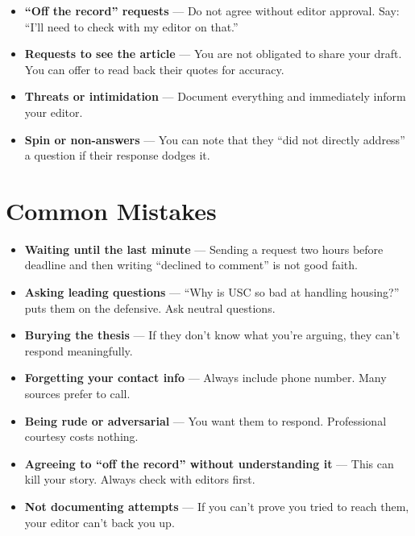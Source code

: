 \documentclass[12pt]{article}
\newcommand{\key}[1]{\textbf{#1}}
\begin{document}
\begin{exampleblock}
\begin{itemize}
  \item \key{``Off the record'' requests} --- Do not agree without editor approval. Say: ``I'll need to check with my editor on that.''
  \item \key{Requests to see the article} --- You are not obligated to share your draft. You can offer to read back their quotes for accuracy.
  \item \key{Threats or intimidation} --- Document everything and immediately inform your editor.
  \item \key{Spin or non-answers} --- You can note that they ``did not directly address'' a question if their response dodges it.
\end{itemize}
\end{exampleblock}

\section{Common Mistakes}

\begin{badbox}
\begin{itemize}
  \item \key{Waiting until the last minute} --- Sending a request two hours before deadline and then writing ``declined to comment'' is not good faith.
  \item \key{Asking leading questions} --- ``Why is USC so bad at handling housing?'' puts them on the defensive. Ask neutral questions.
  \item \key{Burying the thesis} --- If they don't know what you're arguing, they can't respond meaningfully.
  \item \key{Forgetting your contact info} --- Always include phone number. Many sources prefer to call.
  \item \key{Being rude or adversarial} --- You want them to respond. Professional courtesy costs nothing.
  \item \key{Agreeing to ``off the record'' without understanding it} --- This can kill your story. Always check with editors first.
  \item \key{Not documenting attempts} --- If you can't prove you tried to reach them, your editor can't back you up.
\end{itemize}
\end{badbox}
\end{document}
